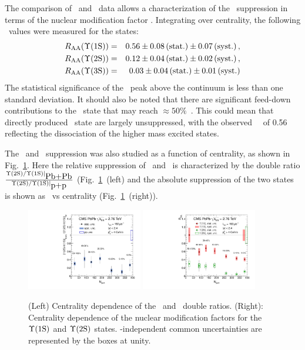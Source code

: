 The comparison of \pp\ and \PbPb\ data allows a characterization of the \PgU\ suppression
in terms of the nuclear modification factor \Raa.
Integrating over centrality, the following \Raa\ values were measured for the \PgUn states:
\begin{eqnarray}
R_\mathrm{AA} (\Upsilon\mathrm{(1S)}) &=& 0.56 \pm 0.08\,\mbox{(stat.)} \pm 0.07\,\mbox{(syst.)} \,, \\
R_\mathrm{AA} (\Upsilon\mathrm{(2S)}) &=& 0.12 \pm 0.04\,\mbox{(stat.)} \pm 0.02\,\mbox{(syst.)} \,, \nonumber \\
R_\mathrm{AA} (\Upsilon\mathrm{(3S)}) &=& 0.03 \pm 0.04\,\mbox{(stat.)} \pm 0.01\,\mbox{(syst.)}  \nonumber\\
\end{eqnarray}
The statistical significance of the \PgUc\ peak above the continuum is less than one standard deviation.
It should also be noted that there are significant feed-down contributions to
the \PgUa\ state that may reach $\approx 50\%$~\cite{Affolder:1999wm, Aaij:2012se}.
This could mean that directly produced \PgUa\ state are largely unsuppressed, with
the observed \PgUa\ \Raa\ of 0.56 reflecting the dissociation of the higher mass excited states.

The \PgUa\ and \PgUb\ suppression was also studied as a function of centrality,
as shown in Fig.~\ref{fig:GR:centrality}.
Here the relative suppression of \PgUa\ and \PgUb\ is characterized by
the double ratio $\frac{\Upsilon\mathrm{(2S)}/\Upsilon\mathrm{(1S)}|_{\mbox{Pb+Pb}}}{\Upsilon\mathrm{(2S)}/\Upsilon\mathrm{(1S)}|_{\mbox{p+p}}}$
(Fig.~\ref{fig:GR:centrality}~(left) and the absolute suppression
of the two states is shown as \Raa\ vs centrality (Fig.~\ref{fig:GR:centrality}~(right)).

\begin{figure}[t]
\begin{center}
   \includegraphics[width=0.45\textwidth]{qqbarfigures/chi2VsCent}
   \includegraphics[width=0.45\textwidth]{qqbarfigures/RaaPt4}
  \caption{(Left) Centrality dependence of the \PgUa\ and \PgUb\ double ratios.  (Right):
Centrality dependence of the nuclear modification factors for the $\Upsilon\mathrm{(1S)}$ and $\Upsilon\mathrm{(2S)}$ states.
\npart-independent common uncertainties are represented by the boxes at unity.}
\label{fig:GR:centrality}
\end{center}
\end{figure}


